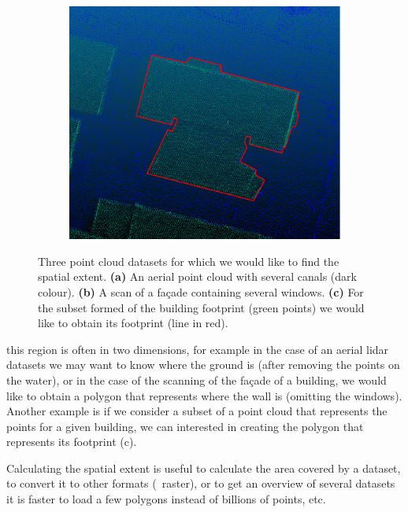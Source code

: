 \begin{figure}
\begin{subfigure}[b]{0.24\linewidth}
    \caption{}
  \end{subfigure}
  \qquad
  \begin{subfigure}[b]{0.28\linewidth}
    \centering
    \includegraphics[width=\textwidth]{figs/footprint.png}
    \caption{}
  \end{subfigure}
\caption{Three point cloud datasets for which we would like to find the spatial extent. \textbf{(a)} An aerial point cloud with several canals (dark colour). \textbf{(b)} A scan of a façade containing several windows. \textbf{(c)} For the subset formed of the building footprint (green points) we would like to obtain its footprint (line in red).}
\end{figure}
this region is often in two dimensions, for example in the case of an aerial lidar datasets we may want to know where the ground is (after removing the points on the water), or in the case of the scanning of the façade of a building, we would like to obtain a polygon that represents where the wall is (omitting the windows).
Another example is if we consider a subset of a point cloud that represents the points for a given building, we can interested in creating the polygon that represents its footprint (c).

%

Calculating the spatial extent is useful to calculate the area covered by a dataset, to convert it to other formats (\eg\ raster), or to get an overview of several datasets it is faster to load a few polygons instead of billions of points, etc.

